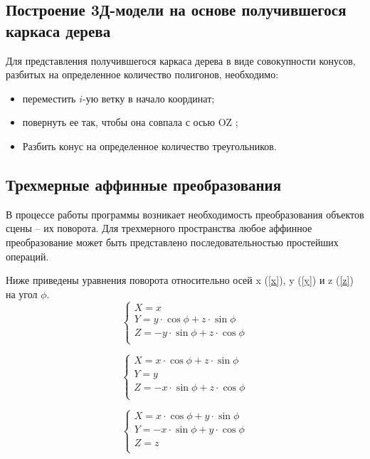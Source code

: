 \documentclass[54pt, a4paper]{article}
\begin{document}
	\subsection{Построение 3Д-модели на основе получившегося каркаса дерева}
	
	Для представления получившегося каркаса дерева в виде совокупности конусов, разбитых на определенное количество полигонов, необходимо:
	\begin{itemize}
		\item переместить $i$-ую ветку в начало координат;
		\item повернуть ее так, чтобы она совпала с осью OZ \cite{algo_rotate};
		\item Разбить конус на определенное количество треугольников.
	\end{itemize}
	
	\subsection{Трехмерные аффинные преобразования}
	В процессе работы программы возникает необходимость преобразования объектов сцены – их поворота. Для трехмерного пространства любое аффинное преобразование может быть представлено последовательностью простейших операций.
	 
	Ниже приведены уравнения поворота относительно осей x (\ref{x}), y (\ref{y}) и z (\ref{z}) на угол $\phi$.
	\begin{equation}
	\begin{cases}
	X = x\\
	Y = y\cdot\cos\phi + z\cdot\sin\phi\\
	Z = -y\cdot\sin\phi + z\cdot\cos\phi\\
	\end{cases}
	\label{x}
	\end{equation}
	
	\begin{equation}
	\begin{cases}
	X = x\cdot\cos\phi + z\cdot\sin\phi\\
	Y = y\\
	Z = -x\cdot\sin\phi + z\cdot\cos\phi\\
	\end{cases}
	\label{y}
	\end{equation}
	
	\begin{equation}
	\begin{cases}
	X = x\cdot\cos\phi + y\cdot\sin\phi\\
	Y = -x\cdot\sin\phi + y\cdot\cos\phi\\
	Z = z\\
	\end{cases}
	\label{z}
	\end{equation}
	
\end{document}
